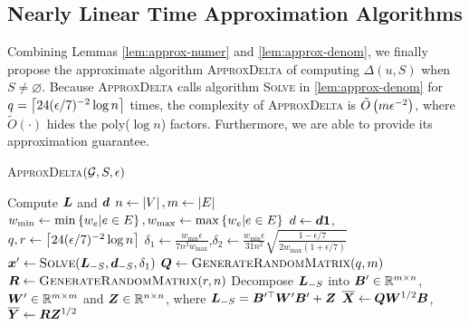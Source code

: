 \documentclass[sigconf]{acmart}
\begin{document}
\subsection{Nearly Linear Time Approximation Algorithms}

Combining Lemmas \ref{lem:approx-numer} and \ref{lem:approx-denom}, we finally propose the approximate algorithm \textsc{ApproxDelta} of computing \(\Delta(u,S)\) when \(S\neq\varnothing\).
Because \textsc{ApproxDelta} calls algorithm \textsc{Solve} in \ref{lem:approx-denom} for \(q=\left\lceil24(\epsilon/7)^{-2}\log n\right\rceil\) times, the complexity of \textsc{ApproxDelta} is \(\tilde{O}\left( m\epsilon^{-2} \right)\), where \(\tilde{O}(\cdot)\) hides the poly(\(\log n\)) factors.
Furthermore, we are able to provide its approximation guarantee.

\begin{algorithm}
  \caption{\textsc{ApproxDelta}\((\mathcal{G},S,\epsilon)\)}
  \label{algo:approxdelta}
  Compute \(\boldsymbol{L}\) and \(\boldsymbol{d}\)\;
  \(n\gets\left|V \right|,m\gets\left|E \right|\)\;
  \(w_{\min}\gets\min\left\{w_e|e\in E \right\},w_{\max}\gets\max\left\{w_e|e\in E \right\}\)\;
  \(d\gets\boldsymbol{d}\boldsymbol{1}\),\(q,r\gets\left\lceil24(\epsilon/7)^{-2}\log n\right\rceil\)\;
  \(\delta_1\gets \frac{w_{\min}\epsilon}{7n^2w_{\max}}\),\(\delta_2\gets \frac{w_{\min}\epsilon}{31n^2}\sqrt{\frac{1-\epsilon/7}{2w_{\max}(1+\epsilon/7)}}\)\;
  \(\boldsymbol{x}'\gets\textsc{Solve}(\boldsymbol{L}_{-S},\boldsymbol{d}_{-S},\delta_1)\)\;
  \(\boldsymbol{Q}\gets\textsc{GenerateRandomMatrix}(q,m)\)\;
  \(\boldsymbol{R}\gets\textsc{GenerateRandomMatrix}(r,n)\)\;
  Decompose \(\boldsymbol{L}_{-S}\) into \(\boldsymbol{B}'\in\mathbb{R}^{m\times n}\), \(\boldsymbol{W}'\in\mathbb{R}^{m\times m}\) and \(\boldsymbol{Z}\in\mathbb{R}^{n\times n}\), where \(\boldsymbol{L}_{-S}=\boldsymbol{B}'^\top\boldsymbol{W}'\boldsymbol{B}'+\boldsymbol{Z}\)\;
  \(\overline{\boldsymbol{X}}\gets\boldsymbol{Q}\boldsymbol{W}^{1/2}\boldsymbol{B}\),\(\overline{\boldsymbol{Y}}\gets\boldsymbol{R}\boldsymbol{Z}^{1/2}\)\;

\end{algorithm}
\end{document}
